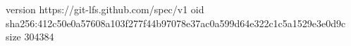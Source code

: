 version https://git-lfs.github.com/spec/v1
oid sha256:412c50e0a57608a103f277f44b97078e37ac0a599d64e322c1c5a1529e3e0d9c
size 304384

